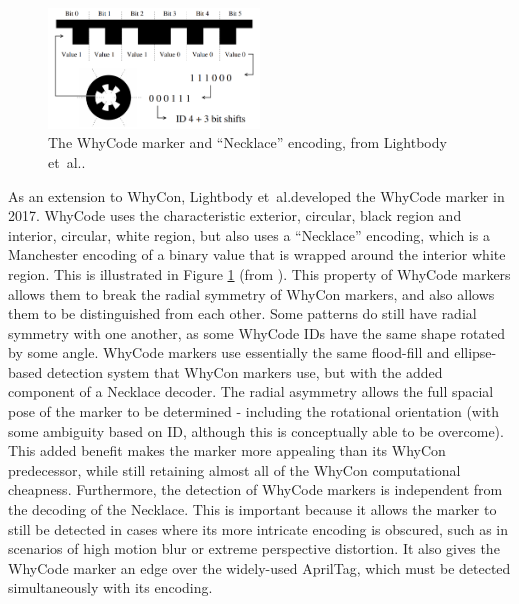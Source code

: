 \begin{figure}
    \centering
    \includegraphics[width=0.5\textwidth]{images/whycode_manchester_explanation.png}
    \caption{The WhyCode marker and ``Necklace'' encoding, from Lightbody et~al.\@.}
    \label{fig:whycode_manchester_explanation}
\end{figure}


As an extension to WhyCon, Lightbody et~al.\@ developed the WhyCode marker in 2017. WhyCode uses the characteristic exterior, circular, black region and interior, circular, white region, but also uses a ``Necklace'' encoding, which is a Manchester encoding of a binary value that is wrapped around the interior white region. This is illustrated in Figure \ref{fig:whycode_manchester_explanation} (from \cite{whycode_paper}). This property of WhyCode markers allows them to break the radial symmetry of WhyCon markers, and also allows them to be distinguished from each other. Some patterns do still have radial symmetry with one another, as some WhyCode IDs have the same shape rotated by some angle. WhyCode markers use essentially the same flood-fill and ellipse-based detection system that WhyCon markers use, but with the added component of a Necklace decoder. The radial asymmetry allows the full spacial pose of the marker to be determined - including the rotational orientation (with some ambiguity based on ID, although this is conceptually able to be overcome). This added benefit makes the marker more appealing than its WhyCon predecessor, while still retaining almost all of the WhyCon computational cheapness. Furthermore, the detection of WhyCode markers is independent from the decoding of the Necklace. This is important because it allows the marker to still be detected in cases where its more intricate encoding is obscured, such as in scenarios of high motion blur or extreme perspective distortion. It also gives the WhyCode marker an edge over the widely-used AprilTag, which must be detected simultaneously with its encoding.


